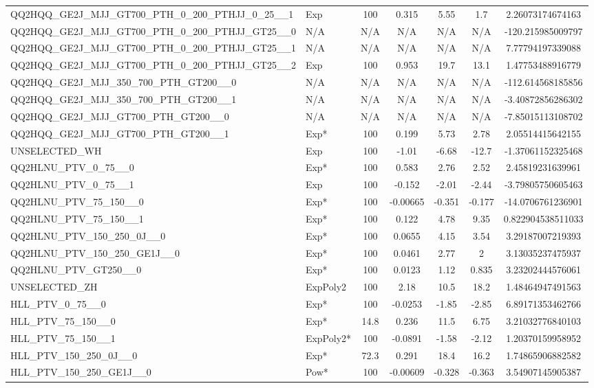 \begin{table}[!h]
{\begin{tabular}{llccccS[table-format = 3.2, round-mode = places, round-precision = 2]}
 QQ2HQQ\_GE2J\_MJJ\_GT700\_PTH\_0\_200\_PTHJJ\_0\_25\_\_1 &Exp&100&0.315&5.55&1.7&2.26073174674163\\
 QQ2HQQ\_GE2J\_MJJ\_GT700\_PTH\_0\_200\_PTHJJ\_GT25\_\_0 &N/A&N/A&N/A&N/A&N/A&-120.215985009797\\
 QQ2HQQ\_GE2J\_MJJ\_GT700\_PTH\_0\_200\_PTHJJ\_GT25\_\_1 &N/A&N/A&N/A&N/A&N/A&7.77794197339088\\
 QQ2HQQ\_GE2J\_MJJ\_GT700\_PTH\_0\_200\_PTHJJ\_GT25\_\_2 &Exp&100&0.953&19.7&13.1&1.47753488916779\\
 QQ2HQQ\_GE2J\_MJJ\_350\_700\_PTH\_GT200\_\_0 &N/A&N/A&N/A&N/A&N/A&-112.614568185856\\
 QQ2HQQ\_GE2J\_MJJ\_350\_700\_PTH\_GT200\_\_1 &N/A&N/A&N/A&N/A&N/A&-3.40872856286302\\
 QQ2HQQ\_GE2J\_MJJ\_GT700\_PTH\_GT200\_\_0 &N/A&N/A&N/A&N/A&N/A&-7.85015113108702\\
 QQ2HQQ\_GE2J\_MJJ\_GT700\_PTH\_GT200\_\_1 &Exp*&100&0.199&5.73&2.78&2.05514415642155\\
 UNSELECTED\_WH &Exp&100&-1.01&-6.68&-12.7&-1.37061152325468\\
 QQ2HLNU\_PTV\_0\_75\_\_0 &Exp*&100&0.583&2.76&2.52&2.45819231639961\\
 QQ2HLNU\_PTV\_0\_75\_\_1 &Exp&100&-0.152&-2.01&-2.44&-3.79805750605463\\
 QQ2HLNU\_PTV\_75\_150\_\_0 &Exp*&100&-0.00665&-0.351&-0.177&-14.0706761236901\\
 QQ2HLNU\_PTV\_75\_150\_\_1 &Exp*&100&0.122&4.78&9.35&0.822904538511033\\
 QQ2HLNU\_PTV\_150\_250\_0J\_\_0 &Exp*&100&0.0655&4.15&3.54&3.29187007219393\\
 QQ2HLNU\_PTV\_150\_250\_GE1J\_\_0 &Exp*&100&0.0461&2.77&2&3.13035237475937\\
 QQ2HLNU\_PTV\_GT250\_\_0 &Exp*&100&0.0123&1.12&0.835&3.23202444576061\\
 UNSELECTED\_ZH &ExpPoly2&100&2.18&10.5&18.2&1.48464947491563\\
 HLL\_PTV\_0\_75\_\_0 &Exp*&100&-0.0253&-1.85&-2.85&6.89171353462766\\
 HLL\_PTV\_75\_150\_\_0 &Exp*&14.8&0.236&11.5&6.75&3.21032776840103\\
 HLL\_PTV\_75\_150\_\_1 &ExpPoly2*&100&-0.0891&-1.58&-2.12&1.20370159958952\\
 HLL\_PTV\_150\_250\_0J\_\_0 &Exp*&72.3&0.291&18.4&16.2&1.74865906882582\\
 HLL\_PTV\_150\_250\_GE1J\_\_0 &Pow*&100&-0.00609&-0.328&-0.363&3.54907145905387\\

\end{tabular}}
\end{table}
